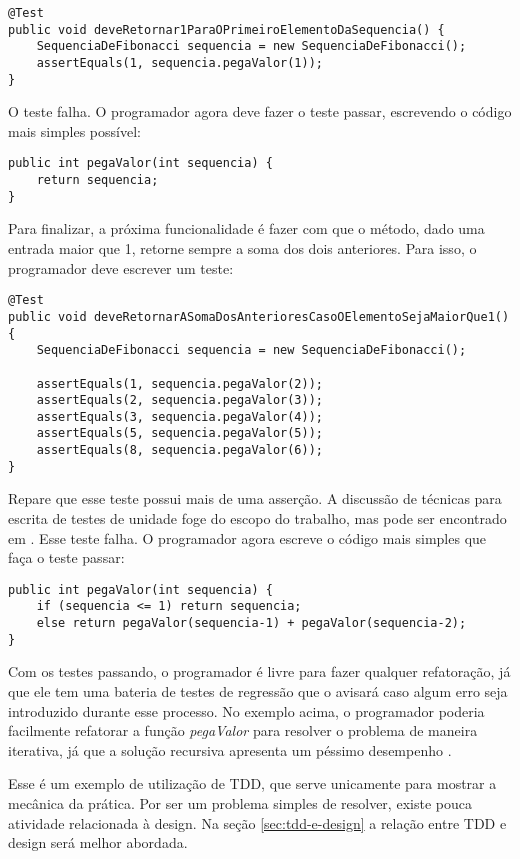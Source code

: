 \begin{lstlisting}[frame=trbl]
@Test
public void deveRetornar1ParaOPrimeiroElementoDaSequencia() {
	SequenciaDeFibonacci sequencia = new SequenciaDeFibonacci();
	assertEquals(1, sequencia.pegaValor(1));		
}
\end{lstlisting}

O teste falha. O programador agora deve fazer o teste passar, escrevendo o código mais simples possível:

\begin{lstlisting}[frame=trbl]
public int pegaValor(int sequencia) {
	return sequencia;
}
\end{lstlisting}

Para finalizar, a próxima funcionalidade é fazer com que o método, dado uma entrada maior que 1, retorne sempre a soma dos dois anteriores.
Para isso, o programador deve escrever um teste:

\begin{lstlisting}[frame=trbl]
@Test
public void deveRetornarASomaDosAnterioresCasoOElementoSejaMaiorQue1() {
	SequenciaDeFibonacci sequencia = new SequenciaDeFibonacci();

	assertEquals(1, sequencia.pegaValor(2));
	assertEquals(2, sequencia.pegaValor(3));	
	assertEquals(3, sequencia.pegaValor(4));
	assertEquals(5, sequencia.pegaValor(5));
	assertEquals(8, sequencia.pegaValor(6));
}
\end{lstlisting}

Repare que esse teste possui mais de uma asserção. A discussão de técnicas para escrita de testes de unidade foge do escopo do trabalho,
mas pode ser encontrado em \cite{xunit}. Esse teste falha. O programador agora escreve o código mais simples que faça o teste passar:

\begin{lstlisting}[frame=trbl]
public int pegaValor(int sequencia) {
	if (sequencia <= 1) return sequencia;
    else return pegaValor(sequencia-1) + pegaValor(sequencia-2);
}
\end{lstlisting}

Com os testes passando, o programador é livre para fazer qualquer refatoração, já que ele tem uma bateria de testes de regressão que o
avisará caso algum erro seja introduzido durante esse processo. No exemplo acima, o programador poderia facilmente refatorar a função
\textit{pegaValor} para resolver o problema de maneira iterativa, já que a solução recursiva apresenta um péssimo desempenho \cite{clrs}.
 
Esse é um exemplo de utilização de TDD, que serve unicamente para mostrar a mecânica da prática. Por ser um problema simples de resolver,
existe pouca atividade relacionada à design. Na seção \ref{sec:tdd-e-design} a relação entre TDD e design será melhor abordada.

